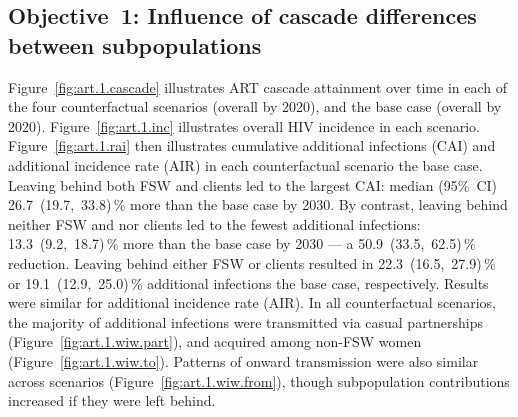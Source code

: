 \subsection{Objective~1: Influence of cascade differences between subpopulations}\label{art.res.1}
Figure~\ref{fig:art.1.cascade} illustrates ART cascade attainment over time
in each of the four counterfactual scenarios (\casmd overall by 2020),
and the base case (\cashi overall by 2020).
Figure~\ref{fig:art.1.inc} illustrates overall HIV incidence in each scenario.
Figure~\ref{fig:art.1.rai} then illustrates
cumulative additional infections (CAI) and additional incidence rate (AIR)
in each counterfactual scenario \vs the base case.
Leaving behind both FSW and clients led to the largest CAI: median (95\%~CI)
26.7~(19.7,~33.8)\,\% more than the base case by 2030. %
By contrast, leaving behind neither FSW and nor clients led to the fewest additional infections:
13.3~(9.2,~18.7)\,\% more than the base case by 2030 --- %
a 50.9~(33.5,~62.5)\,\% reduction. %
Leaving behind either FSW or clients resulted in
22.3~(16.5,~27.9)\,\% or 19.1~(12.9,~25.0)\,\% additional infections
\vs the base case, respectively. %
Results were similar for additional incidence rate (AIR).
In all counterfactual scenarios, the majority of additional infections were
transmitted via casual partnerships (Figure~\ref{fig:art.1.wiw.part}), %
and acquired among non-FSW women (Figure~\ref{fig:art.1.wiw.to}). %
Patterns of onward transmission were also similar across scenarios %
(Figure~\ref{fig:art.1.wiw.from}),
though subpopulation contributions increased if they were left behind.
